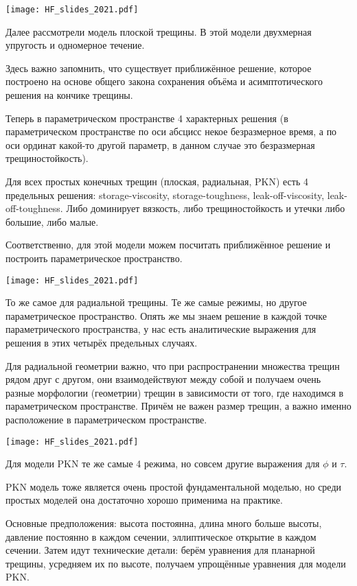\documentclass[main.tex]{subfiles}
\begin{document}
\texttt{[image: HF\_slides\_2021.pdf]}

Далее рассмотрели модель плоской трещины.
В этой модели двухмерная упругость и одномерное течение.

Здесь важно запомнить, что существует приближённое решение, которое построено на основе общего закона сохранения объёма и асимптотического решения на кончике трещины.

Теперь в параметрическом пространстве 4 характерных решения (в параметрическом пространстве по оси абсцисс некое безразмерное время, а по оси ординат какой-то другой параметр, в данном случае это безразмерная трещиностойкость).

Для всех простых конечных трещин (плоская, радиальная, PKN) есть 4 предельных решения: storage-viscosity, storage-toughness, leak-off-viscosity, leak-off-toughness.
Либо доминирует вязкость, либо трещиностойкость и утечки либо большие, либо малые.

Соответственно, для этой модели можем посчитать приближённое решение и построить параметрическое пространство.

\texttt{[image: HF\_slides\_2021.pdf]}

То же самое для радиальной трещины.
Те же самые режимы, но другое параметрическое пространство.
Опять же мы знаем решение в каждой точке параметрического пространства, у нас есть аналитические выражения для решения в этих четырёх предельных случаях.

Для радиальной геометрии важно, что при распространении множества трещин рядом друг с другом, они взаимодействуют между собой и получаем очень разные морфологии (геометрии) трещин в зависимости от того, где находимся в параметрическом пространстве.
Причём не важен размер трещин, а важно именно расположение в параметрическом пространстве.

\texttt{[image: HF\_slides\_2021.pdf]}

Для модели PKN те же самые 4 режима, но совсем другие выражения для $\phi$ и $\tau$.

PKN модель тоже является очень простой фундаментальной моделью, но среди простых моделей она достаточно хорошо применима на практике.

Основные предположения: высота постоянна, длина много больше высоты, давление постоянно в каждом сечении, эллиптическое открытие в каждом сечении.
Затем идут технические детали: берём уравнения для планарной трещины, усредняем их по высоте, получаем упрощённые уравнения для модели PKN.
\end{document}
